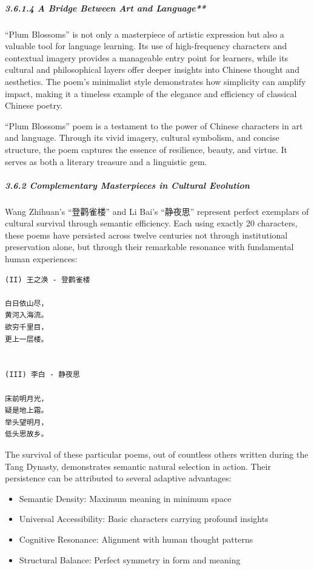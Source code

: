 \documentclass[
]{article}
\providecommand{\tightlist}{%
  \setlength{\itemsep}{0pt}\setlength{\parskip}{0pt}}
\begin{document}
\subparagraph{3.6.1.4 A Bridge Between Art and
Language**}\label{a-bridge-between-art-and-language}

``Plum Blossoms'' is not only a masterpiece of artistic expression but
also a valuable tool for language learning. Its use of high-frequency
characters and contextual imagery provides a manageable entry point for
learners, while its cultural and philosophical layers offer deeper
insights into Chinese thought and aesthetics. The poem's minimalist
style demonstrates how simplicity can amplify impact, making it a
timeless example of the elegance and efficiency of classical Chinese
poetry.

``Plum Blossoms'' poem is a testament to the power of Chinese characters
in art and language. Through its vivid imagery, cultural symbolism, and
concise structure, the poem captures the essence of resilience, beauty,
and virtue. It serves as both a literary treasure and a linguistic gem.

\subparagraph{3.6.2 Complementary Masterpieces in Cultural
Evolution}\label{complementary-masterpieces-in-cultural-evolution}

Wang Zhihuan's ``登鹳雀楼'' and Li Bai's ``静夜思'' represent perfect
exemplars of cultural survival through semantic efficiency. Each using
exactly 20 characters, these poems have persisted across twelve
centuries not through institutional preservation alone, but through
their remarkable resonance with fundamental human experiences:

\begin{verbatim}
(II) 王之涣 - 登鹳雀楼

白日依山尽，
黄河入海流。
欲穷千里目，
更上一层楼。


(III) 李白 - 静夜思

床前明月光，
疑是地上霜。
举头望明月，
低头思故乡。
\end{verbatim}

The survival of these particular poems, out of countless others written
during the Tang Dynasty, demonstrates semantic natural selection in
action. Their persistence can be attributed to several adaptive
advantages:

\begin{itemize}
\tightlist
\item
  Semantic Density: Maximum meaning in minimum space
\item
  Universal Accessibility: Basic characters carrying profound insights
\item
  Cognitive Resonance: Alignment with human thought patterns
\item
  Structural Balance: Perfect symmetry in form and meaning
\end{itemize}
\end{document}
